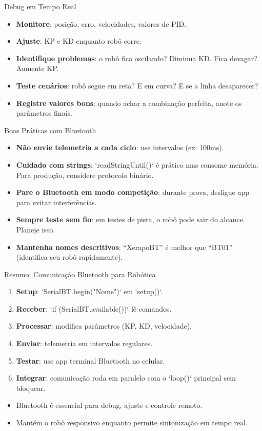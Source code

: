 \documentclass[10pt]{beamer}
\begin{document}
\begin{frame}{Debug em Tempo Real}
  \begin{itemize}
    \item \textbf{Monitore}: posição, erro, velocidades, valores de PID.
    \item \textbf{Ajuste}: KP e KD enquanto robô corre.
    \item \textbf{Identifique problemas}: o robô fica oscilando? Diminua KD. Fica devagar? Aumente KP.
    \item \textbf{Teste cenários}: robô segue em reta? E em curva? E se a linha desaparecer?
    \item \textbf{Registre valores bons}: quando achar a combinação perfeita, anote os parâmetros finais.
  \end{itemize}
\end{frame}

\begin{frame}{Boas Práticas com Bluetooth}
  \begin{itemize}
    \item \textbf{Não envie telemetria a cada ciclo}: use intervalos (ex: 100ms).
    \item \textbf{Cuidado com strings}: `readStringUntil()` é prático mas consome memória. Para produção, considere protocolo binário.
    \item \textbf{Pare o Bluetooth em modo competição}: durante prova, desligue app para evitar interferências.
    \item \textbf{Sempre teste sem fio}: em testes de pista, o robô pode sair do alcance. Planeje isso.
    \item \textbf{Mantenha nomes descritivos}: ``XerapoBT'' é melhor que ``BT01'' (identifica seu robô rapidamente).
  \end{itemize}
\end{frame}

\begin{frame}{Resumo: Comunicação Bluetooth para Robótica}
  \begin{enumerate}
    \item \textbf{Setup}: `SerialBT.begin("Nome")` em `setup()`.
    \item \textbf{Receber}: `if (SerialBT.available())` lê comandos.
    \item \textbf{Processar}: modifica parâmetros (KP, KD, velocidade).
    \item \textbf{Enviar}: telemetria em intervalos regulares.
    \item \textbf{Testar}: use app terminal Bluetooth no celular.
    \item \textbf{Integrar}: comunicação roda em paralelo com o `loop()` principal sem bloquear.
  \end{enumerate}
  
  \begin{itemize}
    \item Bluetooth é essencial para debug, ajuste e controle remoto.
    \item Mantém o robô responsivo enquanto permite sintonização em tempo real.
  \end{itemize}
\end{frame}
\end{document}
